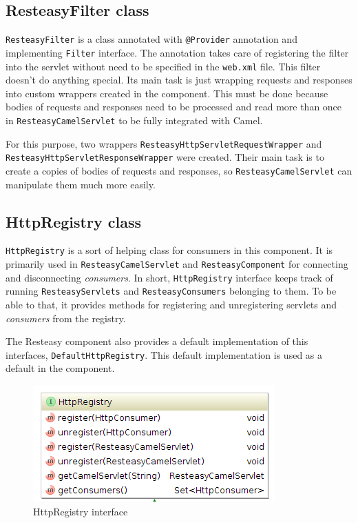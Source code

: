 \documentclass[12pt,final,oneside]{fithesis2}
\begin{document}
\subsection*{ResteasyFilter class}
\texttt{ResteasyFilter} is a class annotated with \texttt{@Provider} annotation and implementing \texttt{Filter} interface. The annotation takes care of registering the filter into the servlet without need to be specified in the \texttt{web.xml} file. This filter doesn't do anything special. Its main task is just wrapping requests and responses into custom wrappers created in the component. This must be done because bodies of requests and responses need to be processed and read more than once in \texttt{ResteasyCamelServlet} to be fully integrated with Camel.

For this purpose, two wrappers \texttt{ResteasyHttpServletRequestWrap\-per} and \texttt{ResteasyHttpServletResponseWrapper} were created. Their main task is to create a copies of bodies of requests and responses, so  \texttt{ResteasyCamelServlet} can manipulate them much more easily.


\subsection{HttpRegistry class}\label{registry}
\texttt{HttpRegistry} is a sort of helping class for consumers in this component. It is primarily used in \texttt{ResteasyCamelServlet} and \texttt{ResteasyComponent} for connecting and disconnecting \textit{consumers}. In short, \texttt{HttpRegistry} interface keeps track of running \texttt{ResteasyServlets} and \texttt{ResteasyConsu\-mers} belonging to them.  To be able to that, it provides methods for registering and unregistering servlets and \textit{consumers} from the registry.

The Resteasy component also provides a default implementation of this interfaces, \texttt{DefaultHttpRegistry}. This default implementation is used as a default in the component. 

\begin{figure}[!h]
\centering
\includegraphics[width=0.8\linewidth]{images/registry.png}
\caption{HttpRegistry interface}
\label{comp}
\end{figure}
\end{document}
